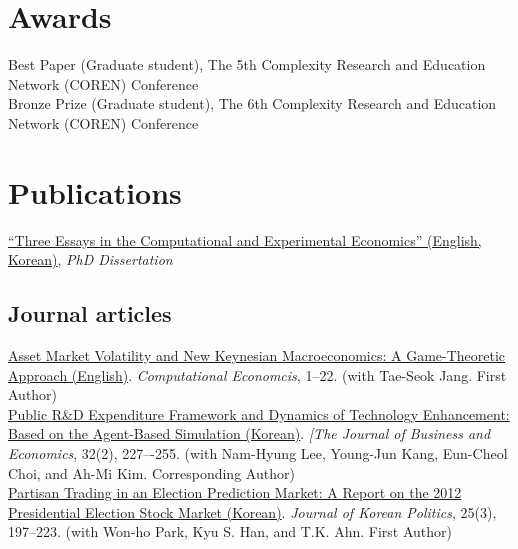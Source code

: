 \documentclass[11pt, a4paper]{article} %
\newcommand{\years}[1]{\marginnote{\scriptsize #1}} %
\begin{document}
%

\section*{Awards}

\years{2010} Best Paper (Graduate student), The 5th Complexity Research and Education Network (COREN) Conference\\
\years{2011} Bronze Prize (Graduate student), The 6th Complexity Research and Education Network (COREN) Conference


\section*{Publications}

\years{2012} \href{http://spsm.snu.ac.kr/namun/papers/phDdraft.full.pdf}{``Three Essays in the Computational and Experimental Economics'' (English, Korean)}, \emph{PhD Dissertation}\\

\subsection*{Journal articles}

\years{2017} \href{https://link.springer.com/article/10.1007/s10614-017-9705-5}{Asset Market Volatility and New Keynesian Macroeconomics: A Game-Theoretic Approach (English)}. \emph{Computational Economcis}, 1--22. (with Tae-Seok Jang. First Author)\\
\years{2016} \href{http://www.earticle.net/article.aspx?sn=278619}{Public R\&D Expenditure Framework and Dynamics of Technology Enhancement: Based on the Agent-Based Simulation (Korean)}. \emph{[The Journal of Business and Economics}, 32(2), 227–-255. (with Nam-Hyung Lee, Young-Jun Kang, Eun-Cheol Choi, and Ah-Mi Kim. Corresponding Author)\\
\years{2016}\href{https://www.kci.go.kr/kciportal/ci/sereArticleSearch/ciSereArtiView.kci?sereArticleSearchBean.artiId=ART002164687}{Partisan Trading in an Election Prediction Market: A Report on the 2012 Presidential Election Stock Market (Korean)}. \emph{Journal of Korean Politics}, 25(3), 197--223. (with Won-ho Park, Kyu S. Han, and T.K. Ahn. First Author)
%
\end{document}
